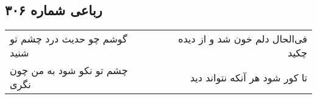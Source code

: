\begin{center}
\section*{رباعی شماره ۳۰۶}
\label{sec:sh306}
\begin{longtable}{l p{0.5cm} r}
گوشم چو حدیث درد چشم تو شنید
&&
فی‌الحال دلم خون شد و از دیده چکید
\\
چشم تو نکو شود به من چون نگری
&&
تا کور شود هر آنکه نتواند دید
\\
\end{longtable}
\end{center}
